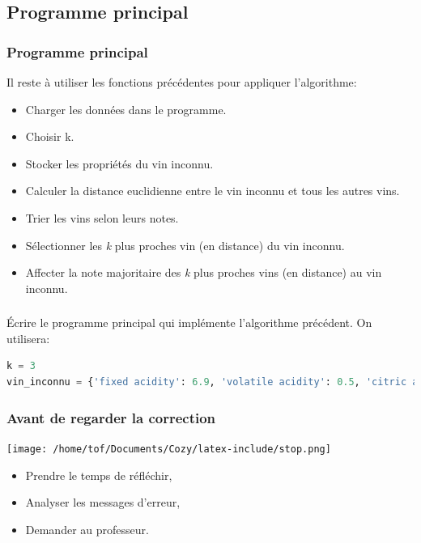 \documentclass[svgnames,11pt]{beamer}
\begin{document}
\subsection{Programme principal}
\begin{frame}
    \frametitle{Programme principal}
Il reste à utiliser les fonctions précédentes pour appliquer l'algorithme:
    \begin{itemize}
        \item Charger les données dans le programme.
        \item Choisir k.
        \item Stocker les propriétés du vin inconnu.
        \item Calculer la distance euclidienne entre le vin inconnu et tous les autres vins.
        \item Trier les vins selon leurs notes.
        \item Sélectionner les \emph{k} plus proches vin (en distance) du vin inconnu.
        \item Affecter la note majoritaire des \emph{k} plus proches vins (en distance) au vin inconnu.
    \end{itemize}

\end{frame}
\begin{frame}[fragile]
    \frametitle{}

    \begin{activite}
    Écrire le programme principal qui implémente l'algorithme précédent. On utilisera:
\begin{center}
\begin{lstlisting}[language=Python , basicstyle=\ttfamily\small, xleftmargin=0.2em, xrightmargin=0em]
k = 3
vin_inconnu = {'fixed acidity': 6.9, 'volatile acidity': 0.5, 'citric acid': 0.19, 'residual sugar': 3.9, 'chlorides': 0.16, 'free sulfur dioxide': 31.0, 'total sulfur dioxide': 50.0, 'density': 0.994, 'pH': 3.01, 'sulphates': 0.61, 'alcohol': 9.3}    
\end{lstlisting}
\end{center}
    \end{activite}

\end{frame}
\begin{frame}
    \frametitle{Avant de regarder la correction}
\begin{center}
    \centering
    \texttt{[image: /home/tof/Documents/Cozy/latex-include/stop.png]}
    \end{center}
{\Large
    \begin{itemize}
        \item Prendre le temps de réfléchir,
        \item Analyser les messages d'erreur,
        \item Demander au professeur.
    \end{itemize}
}
\end{frame}
\end{document}
